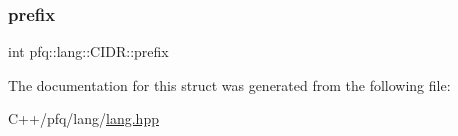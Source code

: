 \mbox{\label{structpfq_1_1lang_1_1CIDR_a1e9458595008285f0831c39e9d87a105}} 
\subsubsection{\texorpdfstring{prefix}{prefix}}
{\footnotesize\ttfamily int pfq\+::lang\+::\+C\+I\+D\+R\+::prefix}



The documentation for this struct was generated from the following file\+:\begin{DoxyCompactItemize}
\item 
C++/pfq/lang/\hyperlink{lang_8hpp}{lang.\+hpp}\end{DoxyCompactItemize}

